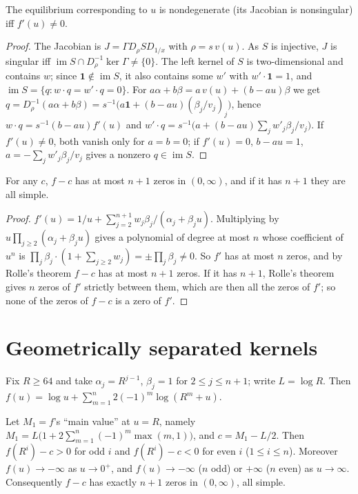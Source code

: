 \documentclass[11pt,a4paper]{report}
\providecommand{\im}{\operatorname{im}}
\begin{document}
\begin{lemma}\label{lem:nondeg}
The equilibrium corresponding to \(u\) is nondegenerate (its Jacobian is nonsingular) iff \(f'(u)\neq0\).
\end{lemma}

\begin{proof}
The Jacobian is \(J=\Gamma D_\rho SD_{1/x}\) with \(\rho=s\,v(u)\). As \(S\) is injective, \(J\) is singular iff
\(\im S\cap D_\rho^{-1}\ker\Gamma\neq\{0\}\). The left kernel of \(S\) is two-dimensional and contains \(w\); since
\(\mathbf1\notin\im S\), it also contains some \(w'\) with \(w'\cdot\mathbf1=1\), and \(\im S=\{q:w\cdot q=w'\cdot q=0\}\). For
\(a\alpha+b\beta=a\,v(u)+(b-au)\beta\) we get
\(q=D_\rho^{-1}(a\alpha+b\beta)=s^{-1}\bigl(a\mathbf1+(b-au)(\beta_j/v_j)_j\bigr)\), hence
\(w\cdot q=s^{-1}(b-au)f'(u)\) and \(w'\cdot q=s^{-1}\bigl(a+(b-au)\textstyle\sum_jw'_j\beta_j/v_j\bigr)\). If \(f'(u)\ne0\),
both vanish only for \(a=b=0\); if \(f'(u)=0\), \(b-au=1\), \(a=-\sum_jw'_j\beta_j/v_j\) gives a nonzero \(q\in\im S\).
\end{proof}

\begin{lemma}\label{lem:degree}
For any \(c\), \(f-c\) has at most \(n+1\) zeros in \((0,\infty)\), and if it has \(n+1\) they are all simple.
\end{lemma}

\begin{proof}
\(f'(u)=1/u+\sum_{j=2}^{n+1}w_j\beta_j/(\alpha_j+\beta_ju)\). Multiplying by \(u\prod_{j\ge2}(\alpha_j+\beta_ju)\) gives a
polynomial of degree at most \(n\) whose coefficient of \(u^n\) is \(\prod_j\beta_j\cdot(1+\sum_{j\ge2}w_j)=\pm\prod_j\beta_j\neq0\).
So \(f'\) has at most \(n\) zeros, and by Rolle's theorem \(f-c\) has at most \(n+1\) zeros. If it has \(n+1\), Rolle's
theorem gives \(n\) zeros of \(f'\) strictly between them, which are then all the zeros of \(f'\); so none of the zeros
of \(f-c\) is a zero of \(f'\).
\end{proof}

\section{Geometrically separated kernels}\label{sec:geom}

Fix \(R\ge64\) and take \(\alpha_j=R^{j-1}\), \(\beta_j=1\) for \(2\le j\le n+1\); write \(L=\log R\). Then
\(f(u)=\log u+\sum_{m=1}^{n}2(-1)^m\log(R^m+u)\).

\begin{proposition}\label{prop:signs}
Let \(M_1=f\)'s ``main value'' at \(u=R\), namely \(M_1=L\bigl(1+2\sum_{m=1}^n(-1)^m\max(m,1)\bigr)\), and \(c=M_1-L/2\). Then
\(f(R^i)-c>0\) for odd \(i\) and \(f(R^i)-c<0\) for even \(i\) (\(1\le i\le n\)). Moreover \(f(u)\to-\infty\) as \(u\to0^+\), and
\(f(u)\to-\infty\) (\(n\) odd) or \(+\infty\) (\(n\) even) as \(u\to\infty\). Consequently \(f-c\) has exactly \(n+1\) zeros in
\((0,\infty)\), all simple.
\end{proposition}
\end{document}
